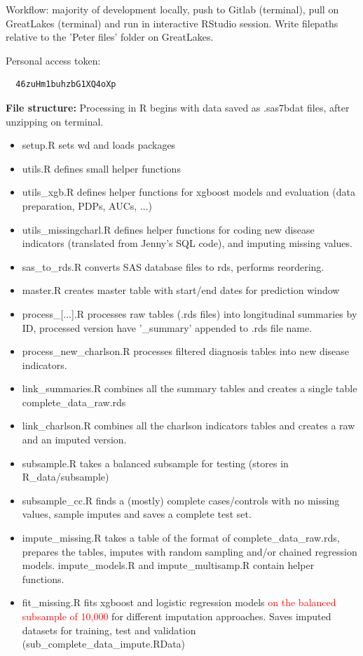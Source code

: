 \documentclass[12pt]{article}
\newcommand{\note}[1]{\textcolor{red}{#1}}
\begin{document}
Workflow: majority of development locally, push to Gitlab (terminal), pull on GreatLakes (terminal) and run in interactive RStudio session. Write filepaths relative to the 'Peter files' folder on GreatLakes.

Personal access token:
\begin{verbatim}
  46zuHm1buhzbG1XQ4oXp
\end{verbatim}

{\bf File structure:}
Processing in R begins with data saved as .sas7bdat files, after unzipping on terminal.
\begin{itemize}
  \item setup.R sets wd and loads packages
  \item utils.R defines small helper functions
  \item utils\_xgb.R defines helper functions for xgboost models and evaluation (data preparation, PDPs, AUCs, ...)
  \item utils\_missingcharl.R defines helper functions for coding new disease indicators (translated from Jenny's SQL code), and imputing missing values.
  \item sas\_to\_rds.R converts SAS database files to rds, performs reordering.
  \item master.R creates master table with start/end dates for prediction window
  \item process\_[...].R processes raw tables (.rds files) into longitudinal summaries by ID, processed version have '\_summary' appended to .rds file name.
  \item process\_new\_charlson.R processes filtered diagnosis tables into new disease indicators.
  \item link\_summaries.R combines all the summary tables and creates a single table complete\_data\_raw.rds
  \item link\_charlson.R combines all the charlson indicators tables and creates a raw and an imputed version.
  \item subsample.R takes a balanced subsample for testing (stores in R\_data/subsample)
  \item subsample\_cc.R finds a (mostly) complete cases/controls with no missing values, sample imputes and saves a complete test set.
  \item impute\_missing.R takes a table of the format of complete\_data\_raw.rds, prepares the tables, imputes with random sampling and/or chained regression models. impute\_models.R and impute\_multisamp.R contain helper functions.
  \item fit\_missing.R fits xgboost and logistic regression models \note{on the balanced subsample of 10,000} for different imputation approaches. Saves imputed datasets for training, test and validation (sub\_complete\_data\_impute.RData)

\end{itemize}
\end{document}
